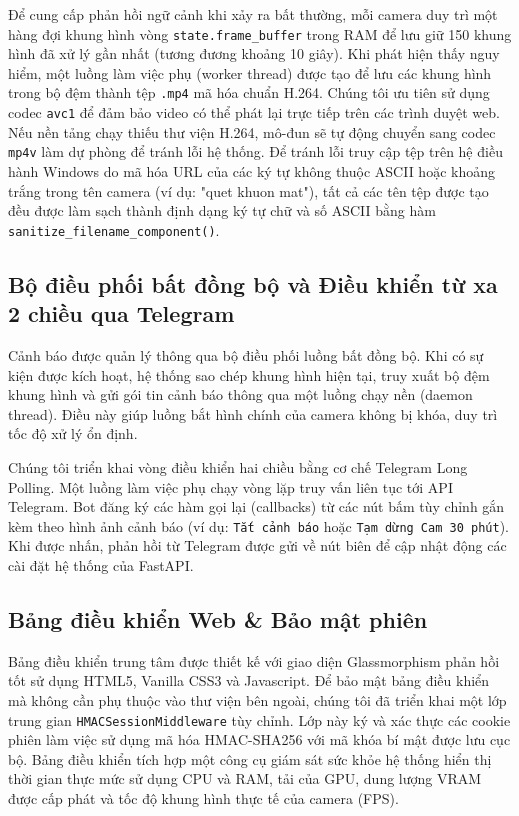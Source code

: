 \documentclass[12pt,a4paper]{article}
\begin{document}
Để cung cấp phản hồi ngữ cảnh khi xảy ra bất thường, mỗi camera duy trì một hàng đợi khung hình vòng \texttt{state.frame\_buffer} trong RAM để lưu giữ 150 khung hình đã xử lý gần nhất (tương đương khoảng 10 giây). Khi phát hiện thấy nguy hiểm, một luồng làm việc phụ (worker thread) được tạo để lưu các khung hình trong bộ đệm thành tệp \texttt{.mp4} mã hóa chuẩn H.264.
Chúng tôi ưu tiên sử dụng codec \texttt{avc1} để đảm bảo video có thể phát lại trực tiếp trên các trình duyệt web. Nếu nền tảng chạy thiếu thư viện H.264, mô-đun sẽ tự động chuyển sang codec \texttt{mp4v} làm dự phòng để tránh lỗi hệ thống.
Để tránh lỗi truy cập tệp trên hệ điều hành Windows do mã hóa URL của các ký tự không thuộc ASCII hoặc khoảng trắng trong tên camera (ví dụ: "quet khuon mat"), tất cả các tên tệp được tạo đều được làm sạch thành định dạng ký tự chữ và số ASCII bằng hàm \texttt{sanitize\_filename\_component()}.

\subsection{Bộ điều phối bất đồng bộ và Điều khiển từ xa 2 chiều qua Telegram}
Cảnh báo được quản lý thông qua bộ điều phối luồng bất đồng bộ. Khi có sự kiện được kích hoạt, hệ thống sao chép khung hình hiện tại, truy xuất bộ đệm khung hình và gửi gói tin cảnh báo thông qua một luồng chạy nền (daemon thread). Điều này giúp luồng bắt hình chính của camera không bị khóa, duy trì tốc độ xử lý ổn định.

Chúng tôi triển khai vòng điều khiển hai chiều bằng cơ chế Telegram Long Polling. Một luồng làm việc phụ chạy vòng lặp truy vấn liên tục tới API Telegram. Bot đăng ký các hàm gọi lại (callbacks) từ các nút bấm tùy chỉnh gắn kèm theo hình ảnh cảnh báo (ví dụ: \texttt{Tắt cảnh báo} hoặc \texttt{Tạm dừng Cam 30 phút}). Khi được nhấn, phản hồi từ Telegram được gửi về nút biên để cập nhật động các cài đặt hệ thống của FastAPI.

\subsection{Bảng điều khiển Web \& Bảo mật phiên}
Bảng điều khiển trung tâm được thiết kế với giao diện Glassmorphism phản hồi tốt sử dụng HTML5, Vanilla CSS3 và Javascript.
Để bảo mật bảng điều khiển mà không cần phụ thuộc vào thư viện bên ngoài, chúng tôi đã triển khai một lớp trung gian \texttt{HMACSessionMiddleware} tùy chỉnh. Lớp này ký và xác thực các cookie phiên làm việc sử dụng mã hóa HMAC-SHA256 với mã khóa bí mật được lưu cục bộ. Bảng điều khiển tích hợp một công cụ giám sát sức khỏe hệ thống hiển thị thời gian thực mức sử dụng CPU và RAM, tải của GPU, dung lượng VRAM được cấp phát và tốc độ khung hình thực tế của camera (FPS).
\end{document}
